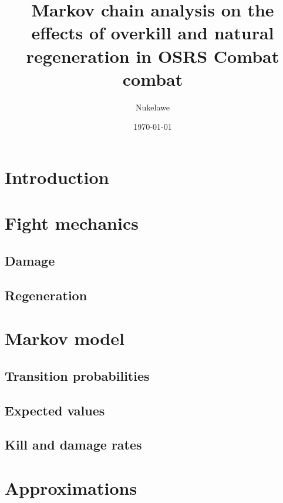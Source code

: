 

\title{Markov chain analysis on the effects of overkill and natural regeneration in OSRS Combat combat}
\author{Nukelawe}
\date{\today}
\maketitle

\tableofcontents
\pagebreak

\section{Introduction}\label{chap:introduction}

\pagebreak

\section{Fight mechanics}\label{chap:mechanics}
	\subsection{Damage}\label{chap:fightMechanics}
	
	\subsection{Regeneration}\label{chap:regenMechanics}
	
\pagebreak

\section{Markov model}\label{chap:markovModel}
	
	\subsection{Transition probabilities}\label{chap:transitionProbabilities}
	
	\subsection{Expected values}\label{chap:expectations}
	
	\subsection{Kill and damage rates}\label{chap:rates}
	
\pagebreak

\section{Approximations}\label{chap:appr}
	
